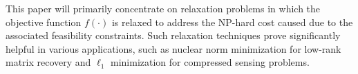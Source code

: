 \documentclass[12pt,draftcls,onecolumn]{IEEEtran}
\begin{document}
This paper will primarily concentrate on relaxation problems in which the objective function $f(\cdot)$ is relaxed to address the NP-hard cost caused due to the associated  feasibility constraints. Such relaxation techniques prove significantly helpful in various applications, such as nuclear norm minimization for low-rank matrix recovery and $\ell_1$ minimization for compressed sensing problems.
\end{document}
